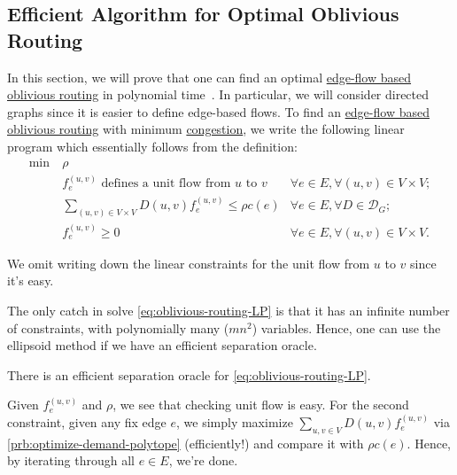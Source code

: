 \subsection{Efficient Algorithm for Optimal Oblivious Routing}
In this section, we will prove that one can find an optimal \hyperref[def:edge-based-oblivious-routing]{edge-flow based oblivious routing} in polynomial time~\cite{azar2003optimal}. In particular, we will consider directed graphs since it is easier to define edge-based flows. To find an \hyperref[def:edge-based-oblivious-routing]{edge-flow based oblivious routing} with minimum \hyperref[def:congestion-of-oblivious-routing]{congestion}, we write the following linear program which essentially follows from the definition:
\begin{equation}\label{eq:oblivious-routing-LP}
	\begin{aligned}
		\min~ & \rho                                                                                                                \\
		      & f_e^{(u, v)} \text{ defines a unit flow from \(u\) to \(v\)}      & \forall e \in E, \forall (u, v) \in V \times V; \\
		      & \sum_{(u, v) \in V \times V} D(u, v) f_e^{(u, v)}  \leq \rho c(e) & \forall e \in E, \forall D \in \mathcal{D} _G;  \\
		      & f_e^{(u, v)} \geq 0                                               & \forall e \in E, \forall (u, v) \in V \times V.
	\end{aligned}
\end{equation}

\begin{note}
	We omit writing down the linear constraints for the unit flow from \(u\) to \(v\) since it's easy.
\end{note}

The only catch in solve \autoref{eq:oblivious-routing-LP} is that it has an infinite number of constraints, with polynomially many (\(mn^2\)) variables. Hence, one can use the ellipsoid method if we have an efficient separation oracle.

\begin{claim}
	There is an efficient separation oracle for \autoref{eq:oblivious-routing-LP}.
\end{claim}
\begin{explanation}
	Given \(f_e^{(u, v)}\) and \(\rho \), we see that checking unit flow is easy. For the second constraint, given any fix edge \(e\), we simply maximize \(\sum_{u, v \in V} D(u, v) f_e^{(u, v)}\) via \autoref{prb:optimize-demand-polytope} (efficiently!) and compare it with \(\rho c(e)\). Hence, by iterating through all \(e \in E\), we're done.
\end{explanation}

